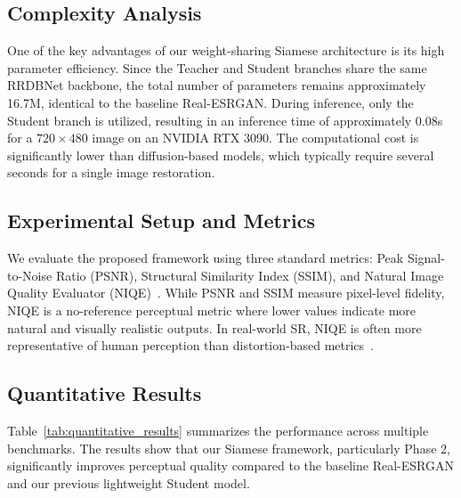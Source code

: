 \documentclass[conference]{IEEEtran}
\begin{document}
\subsection{Complexity Analysis}
One of the key advantages of our weight-sharing Siamese architecture is its high parameter efficiency. Since the Teacher and Student branches share the same RRDBNet backbone, the total number of parameters remains approximately 16.7M, identical to the baseline Real-ESRGAN. During inference, only the Student branch is utilized, resulting in an inference time of approximately 0.08s for a $720 \times 480$ image on an NVIDIA RTX 3090. The computational cost is significantly lower than diffusion-based models, which typically require several seconds for a single image restoration.


\subsection{Experimental Setup and Metrics}

We evaluate the proposed framework using three standard metrics: Peak Signal-to-Noise Ratio (PSNR), Structural Similarity Index (SSIM), and Natural Image Quality Evaluator (NIQE)~\cite{mittal2012making}. While PSNR and SSIM measure pixel-level fidelity, NIQE is a no-reference perceptual metric where lower values indicate more natural and visually realistic outputs. In real-world SR, NIQE is often more representative of human perception than distortion-based metrics~\cite{wang2021realesrgan}.

\subsection{Quantitative Results}

Table~\ref{tab:quantitative_results} summarizes the performance across multiple benchmarks. The results show that our Siamese framework, particularly Phase 2, significantly improves perceptual quality compared to the baseline Real-ESRGAN and our previous lightweight Student model.

\end{document}
